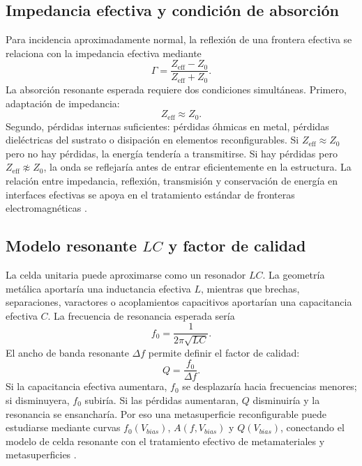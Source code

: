 \documentclass[12pt,a4paper]{article}
\begin{document}
\subsection{Impedancia efectiva y condición de absorción}

Para incidencia aproximadamente normal, la reflexión de una frontera efectiva se relaciona con la impedancia efectiva mediante
\begin{equation}
  \Gamma=\frac{Z_{\mathrm{eff}}-Z_0}{Z_{\mathrm{eff}}+Z_0}.
  \label{eq:gamma_impedance}
\end{equation}
La absorción resonante esperada requiere dos condiciones simultáneas. Primero, adaptación de impedancia:
\begin{equation}
  Z_{\mathrm{eff}}\approx Z_0.
  \label{eq:impedance_match}
\end{equation}
Segundo, pérdidas internas suficientes: pérdidas óhmicas en metal, pérdidas dieléctricas del sustrato o disipación en elementos reconfigurables. Si \(Z_{\mathrm{eff}}\approx Z_0\) pero no hay pérdidas, la energía tendería a transmitirse. Si hay pérdidas pero \(Z_{\mathrm{eff}}\not\approx Z_0\), la onda se reflejaría antes de entrar eficientemente en la estructura. La relación entre impedancia, reflexión, transmisión y conservación de energía en interfaces efectivas se apoya en el tratamiento estándar de fronteras electromagnéticas \citep{milton2024classical,jackson1999classical}.

\subsection{Modelo resonante \texorpdfstring{\(LC\)}{LC} y factor de calidad}

La celda unitaria puede aproximarse como un resonador \(LC\). La geometría metálica aportaría una inductancia efectiva \(L\), mientras que brechas, separaciones, varactores o acoplamientos capacitivos aportarían una capacitancia efectiva \(C\). La frecuencia de resonancia esperada sería
\begin{equation}
  f_0=\frac{1}{2\pi\sqrt{LC}}.
  \label{eq:f0_lc}
\end{equation}
El ancho de banda resonante \(\Delta f\) permite definir el factor de calidad:
\begin{equation}
  Q=\frac{f_0}{\Delta f}.
  \label{eq:q_factor}
\end{equation}
Si la capacitancia efectiva aumentara, \(f_0\) se desplazaría hacia frecuencias menores; si disminuyera, \(f_0\) subiría. Si las pérdidas aumentaran, \(Q\) disminuiría y la resonancia se ensancharía. Por eso una metasuperficie reconfigurable puede estudiarse mediante curvas \(f_0(V_{bias})\), \(A(f,V_{bias})\) y \(Q(V_{bias})\), conectando el modelo de celda resonante con el tratamiento efectivo de metamateriales y metasuperficies \citep{engheta2006metamaterials,holloway2012overview}.
\end{document}
